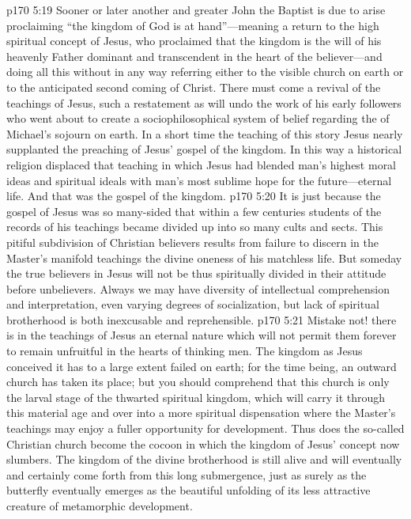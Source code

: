 \vs p170 5:19 Sooner or later another and greater John the Baptist is due to arise proclaiming “the kingdom of God is at hand”---meaning a return to the high spiritual concept of Jesus, who proclaimed that the kingdom is the will of his heavenly Father dominant and transcendent in the heart of the believer---and doing all this without in any way referring either to the visible church on earth or to the anticipated second coming of Christ. There must come a revival of the  teachings of Jesus, such a restatement as will undo the work of his early followers who went about to create a sociophilosophical system of belief regarding the  of Michael’s sojourn on earth. In a short time the teaching of this story  Jesus nearly supplanted the preaching of Jesus’ gospel of the kingdom. In this way a historical religion displaced that teaching in which Jesus had blended man’s highest moral ideas and spiritual ideals with man’s most sublime hope for the future---eternal life. And that was the gospel of the kingdom.
\vs p170 5:20 It is just because the gospel of Jesus was so many\hyp{}sided that within a few centuries students of the records of his teachings became divided up into so many cults and sects. This pitiful subdivision of Christian believers results from failure to discern in the Master’s manifold teachings the divine oneness of his matchless life. But someday the true believers in Jesus will not be thus spiritually divided in their attitude before unbelievers. Always we may have diversity of intellectual comprehension and interpretation, even varying degrees of socialization, but lack of spiritual brotherhood is both inexcusable and reprehensible.
\vs p170 5:21 Mistake not! there is in the teachings of Jesus an eternal nature which will not permit them forever to remain unfruitful in the hearts of thinking men. The kingdom as Jesus conceived it has to a large extent failed on earth; for the time being, an outward church has taken its place; but you should comprehend that this church is only the larval stage of the thwarted spiritual kingdom, which will carry it through this material age and over into a more spiritual dispensation where the Master’s teachings may enjoy a fuller opportunity for development. Thus does the so\hyp{}called Christian church become the cocoon in which the kingdom of Jesus’ concept now slumbers. The kingdom of the divine brotherhood is still alive and will eventually and certainly come forth from this long submergence, just as surely as the butterfly eventually emerges as the beautiful unfolding of its less attractive creature of metamorphic development.
